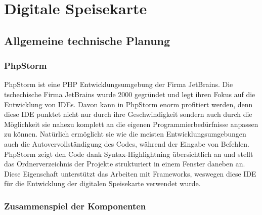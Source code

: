 \chapter{Digitale Speisekarte}
\renewcommand{\kapitelautor}{Autor: Katharina Joksch}

\section{Allgemeine technische Planung}

  \subsection{PhpStorm}

PhpStorm ist eine PHP Entwicklungsumgebung der Firma JetBrains. Die tschechische Firma JetBrains wurde 2000 gegründet und legt ihren Fokus auf die Entwicklung von IDEs. Davon kann in PhpStorm enorm profitiert werden, denn diese IDE punktet nicht nur durch ihre Geschwindigkeit sondern auch durch die Möglichkeit sie nahezu komplett an die eigenen Programmierbedürfnisse anpassen zu können. Natürlich ermöglicht sie wie die meisten Entwicklungsumgebungen auch die Autovervollständigung des Codes, während der Eingabe von Befehlen. PhpStorm zeigt den Code dank Syntax-Highlightning übersichtlich an und stellt das Ordnerverzeichnis der Projekte strukturiert in einem Fenster daneben an. Diese Eigenschaft unterstützt das Arbeiten mit Frameworks, weswegen diese IDE für die Entwicklung der digitalen Speisekarte verwendet wurde.

  \subsection{Zusammenspiel der Komponenten}

